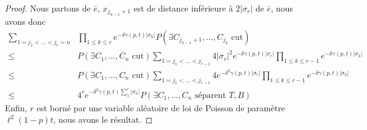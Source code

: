 \documentclass[titlepage,a4paper,12pt]{article}
\begin{document}
\begin{proof}
Nous partons de $\bar{e}$, $x_{j_{n-1}+1}$ est de distance inférieure à $2|\sigma_r|$ de $\bar{e}$, nous avons donc 
\begin{align*}\sum_{1=j_1<\dots < j_r = n} &\prod_{1\leqslant k \leqslant r} e^{-\delta \gamma(p,t)|\sigma_k|} P(\exists C_{j_{k-1}+1},\dots,C_{j_k} \text{ cut}) \\
\leqslant & P(\exists C_1,\dots,C_n \text{ cut})\sum_{1=j_1<\dots < j_{r-1}} 4|\sigma_r|^2e^{-\delta \gamma(p,t)|\sigma_r|}\prod_{1\leqslant k \leqslant r-1}e^{-\delta \gamma(p,t)|\sigma_k|} \\
\leqslant & P(\exists C_1,\dots,C_n \text{ cut})\sum_{1=j_1<\dots < j_{r-1}} 4e^{-\delta^2 \gamma(p,t)|\sigma_r|}\prod_{1\leqslant k \leqslant r-1}e^{-\delta \gamma(p,t)|\sigma_k|} \\
\leqslant & 4^r e^{-\delta^2 \gamma(p,t)\sum_1^r|\sigma_k|}P(\exists C_1,\dots,C_n \text{ séparent } T,B)
\end{align*}
Enfin, $r$ est borné par une variable aléatoire de loi de Poisson de paramètre $\ell^2 (1-p) t$, nous avons le résultat.
\end{proof}
\end{document}
